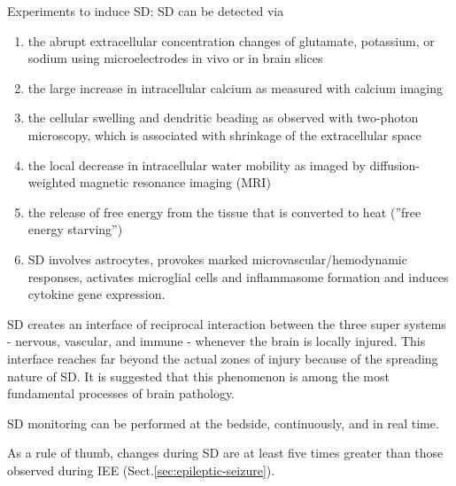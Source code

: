 \begin{mdframed}

Experiments to induce SD: SD can be detected via 
\begin{enumerate}

  \item  the abrupt extracellular concentration changes of glutamate, potassium,
  or sodium using microelectrodes in vivo or in brain slices

  \item the large increase in intracellular calcium as measured with calcium
  imaging

  \item the cellular swelling and dendritic beading as observed with
two-photon microscopy, which is associated with
shrinkage of the extracellular space

  \item the local
decrease in intracellular water mobility as imaged by
diffusion-weighted magnetic resonance imaging
(MRI)

  \item the release of free energy from the tissue that is converted to heat
  (''free energy starving'')

  \item  SD involves astrocytes, provokes marked microvascular/hemodynamic
responses, activates microglial cells and
inflammasome formation and induces cytokine gene
expression.

\end{enumerate}

SD creates an interface of reciprocal interaction between the three super
systems -  nervous, vascular, and immune - whenever the brain is locally injured.
This interface reaches far beyond the actual zones of injury because of the
spreading nature of SD. It is suggested that this phenomenon is among the most
fundamental processes of brain pathology.

SD monitoring can be performed at the bedside, continuously, and in real time.
\end{mdframed}

As a rule of thumb, changes during SD are at least five times greater than those
observed during IEE (Sect.\ref{sec:epileptic-seizure}).

